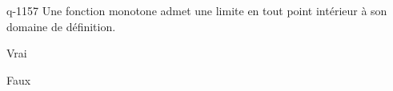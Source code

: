 \begin{truefalse}{q-1157}
Une fonction monotone admet une limite en tout point intérieur à son domaine de définition.
\item Vrai
\item* Faux
\end{truefalse}

